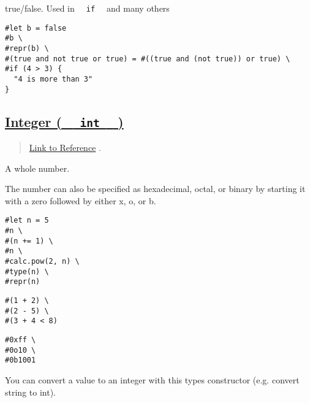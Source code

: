 true/false. Used in \texttt{\ }{\texttt{\ if\ }}\texttt{\ } and many
others

\begin{verbatim}
#let b = false
#b \
#repr(b) \
#(true and not true or true) = #((true and (not true)) or true) \
#if (4 > 3) {
  "4 is more than 3"
}
\end{verbatim}

\pandocbounded{}

\subsection{\texorpdfstring{\hyperref[integer-int]{Integer (
\texttt{\ }{\texttt{\ int\ }}\texttt{\ }
)}}{Integer (   int   )}}\label{integer-int}

\begin{quote}
\href{https://typst.app/docs/reference/foundations/int/}{Link to
Reference} .
\end{quote}

A whole number.

The number can also be specified as hexadecimal, octal, or binary by
starting it with a zero followed by either x, o, or b.

\begin{verbatim}
#let n = 5
#n \
#(n += 1) \
#n \
#calc.pow(2, n) \
#type(n) \
#repr(n)
\end{verbatim}

\pandocbounded{}

\begin{verbatim}
#(1 + 2) \
#(2 - 5) \
#(3 + 4 < 8)
\end{verbatim}

\pandocbounded{}

\begin{verbatim}
#0xff \
#0o10 \
#0b1001
\end{verbatim}

\pandocbounded{}

You can convert a value to an integer with this type\textquotesingle s
constructor (e.g. convert string to int).


